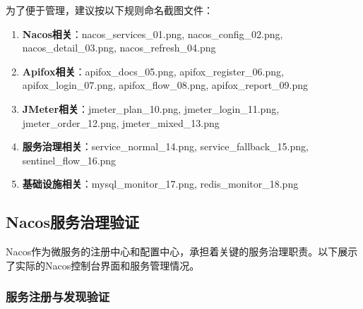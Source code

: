 \documentclass[a4paper,12pt]{article}
\begin{document}
为了便于管理，建议按以下规则命名截图文件：

\begin{enumerate}
\item \textbf{Nacos相关}：nacos\_services\_01.png, nacos\_config\_02.png, nacos\_detail\_03.png, nacos\_refresh\_04.png
\item \textbf{Apifox相关}：apifox\_docs\_05.png, apifox\_register\_06.png, apifox\_login\_07.png, apifox\_flow\_08.png, apifox\_report\_09.png
\item \textbf{JMeter相关}：jmeter\_plan\_10.png, jmeter\_login\_11.png, jmeter\_order\_12.png, jmeter\_mixed\_13.png
\item \textbf{服务治理相关}：service\_normal\_14.png, service\_fallback\_15.png, sentinel\_flow\_16.png
\item \textbf{基础设施相关}：mysql\_monitor\_17.png, redis\_monitor\_18.png
\end{enumerate}

\subsection{Nacos服务治理验证}

Nacos作为微服务的注册中心和配置中心，承担着关键的服务治理职责。以下展示了实际的Nacos控制台界面和服务管理情况。

\subsubsection{服务注册与发现验证}

\begin{figure}[H]
\centering
{}
\end{figure}
\end{document}

